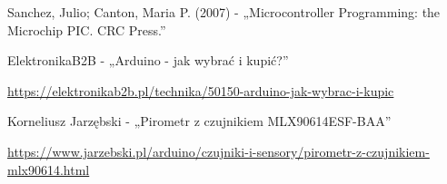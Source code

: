 \cleardoublepage
{}
{}
\begin{thebibliography}{999}
\begin{spacing}{1}

     Sanchez, Julio; Canton, Maria P. (2007) - „Microcontroller Programming: the Microchip PIC. CRC Press.”

     ElektronikaB2B - „Arduino - jak wybrać i kupić?”
    
    \url{https://elektronikab2b.pl/technika/50150-arduino-jak-wybrac-i-kupic}

     Korneliusz Jarzębski - „Pirometr z czujnikiem MLX90614ESF-BAA”

    \url{https://www.jarzebski.pl/arduino/czujniki-i-sensory/pirometr-z-czujnikiem-mlx90614.html}

\end{spacing}
\end{thebibliography}